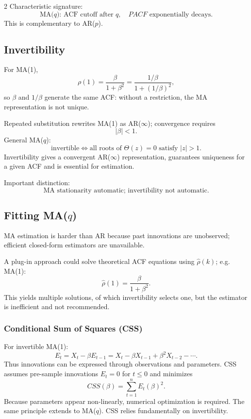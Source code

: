 \documentclass[9pt,a4paper]{extarticle}
\begin{document}
\begin{multicols}{2}
Characteristic signature:
\[
\boxed{\text{MA($q$): ACF cutoff after }q,\quad PACF\text{ exponentially decays}.}
\]
This is complementary to AR($p$).

\subsection{Invertibility}

For MA(1),
\[
\rho(1)=\frac{\beta}{1+\beta^2}
=\frac{1/\beta}{1+(1/\beta)^2},
\]
so \(\beta\) and \(1/\beta\) generate the same ACF: without a restriction, the MA representation is not unique.

Repeated substitution rewrites MA(1) as AR($\infty$); convergence requires
\[
\boxed{|\beta|<1}.
\]
General MA($q$):
\[
\boxed{\text{invertible}\iff
\text{all roots of }\Theta(z)=0\text{ satisfy }|z|>1.}
\]
Invertibility gives a convergent AR($\infty$) representation, guarantees uniqueness for a given ACF and is essential for estimation.

Important distinction:
\[
\boxed{\text{MA stationarity automatic; invertibility not automatic}.}
\]

\subsection{Fitting MA($q$)}

MA estimation is harder than AR because past innovations are unobserved; efficient closed-form estimators are unavailable.

A plug-in approach could solve theoretical ACF equations using \(\widehat\rho(k)\); e.g. MA(1):
\[
\widehat\rho(1)=\frac{\beta}{1+\beta^2}.
\]
This yields multiple solutions, of which invertibility selects one, but the estimator is inefficient and not recommended.

\subsubsection*{Conditional Sum of Squares (CSS)}

For invertible MA(1):
\[
E_t=X_t-\beta E_{t-1}
=X_t-\beta X_{t-1}+\beta^2X_{t-2}-\cdots.
\]
Thus innovations can be expressed through observations and parameters. CSS assumes pre-sample innovations \(E_t=0\) for \(t\le0\) and minimizes
\[
\boxed{CSS(\beta)=\sum_{t=1}^nE_t(\beta)^2.}
\]
Because parameters appear non-linearly, numerical optimization is required. The same principle extends to MA($q$). CSS relies fundamentally on invertibility.


\end{multicols}
\end{document}
